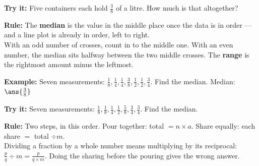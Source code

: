 \documentclass[12pt]{article}
\begin{document}
\begin{tryitbox}
\textbf{Try it:} \quad Five containers each hold $\frac{3}{8}$ of a litre. How much is that altogether?\\[2pt]
\end{tryitbox}


\begin{formulabox}
\textbf{Rule:} The \textbf{median} is the value in the middle place once the data is in order --- and a line plot is already in order, left to right.\\[3pt]
With an odd number of crosses, count in to the middle one. With an even number, the median sits halfway between the two middle crosses. The \textbf{range} is the rightmost amount minus the leftmost.
\end{formulabox}

\begin{examplebox}
\textbf{Example:} \quad Seven measurements: $\frac{1}{8}, \frac{1}{4}, \frac{1}{4}, \frac{3}{8}, \frac{1}{2}, \frac{1}{2}, \frac{3}{4}$. Find the median.
Median: $\ans{\tfrac{3}{8}}$
\end{examplebox}

\begin{tryitbox}
\textbf{Try it:} \quad Seven measurements: $\frac{1}{8}, \frac{1}{8}, \frac{1}{4}, \frac{1}{2}, \frac{5}{8}, \frac{3}{4}, \frac{3}{4}$. Find the median.\\[2pt]
\end{tryitbox}


\begin{formulabox}
\textbf{Rule:} Two steps, in this order. Pour together: total $= n \times a$. Share equally: each share $=$ total $\div m$.\\[3pt]
Dividing a fraction by a whole number means multiplying by its reciprocal: $\frac{p}{q} \div m = \frac{p}{q \times m}$. Doing the sharing before the pouring gives the wrong answer.
\end{formulabox}
\end{document}
